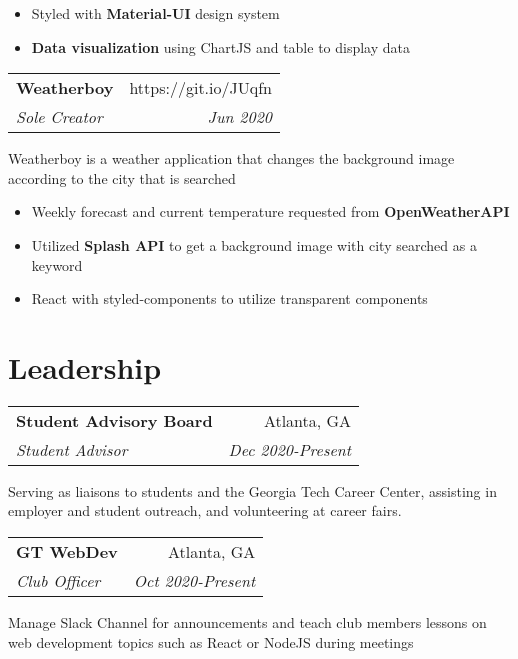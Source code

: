 \documentclass[letterpaper,8pt]{article}
\makeatletter
\newcommand{\resumeSubheading}[4]{
  \vspace{0.25em}
  \begin{tabular*}{1\textwidth}[t]{l@{\extracolsep{\fill}}r}
    \textbf{#1} & #2 \\
    \textit{#3} & \textit{#4} \\
  \end{tabular*}\vspace{-5pt}
}
\makeatother
\begin{document}
\begin{itemize}[label=\raisebox{0.25ex}{\tiny$\bullet$}]
  \item Styled with \textbf{Material-UI} design system
  \item \textbf{Data visualization} using ChartJS and table to display data
\end{itemize}
\vspace{5pt}

\resumeSubheading{Weatherboy}{https://git.io/JUqfn}{Sole Creator}{Jun 2020}

Weatherboy is a weather application that changes the background image according to the city that is searched

\begin{itemize}[label=\raisebox{0.25ex}{\tiny$\bullet$}]
  \item Weekly forecast and current temperature requested from \textbf{OpenWeatherAPI}
  \item Utilized \textbf{Splash API} to get a background image with city searched as a keyword
  \item React with styled-components to utilize transparent components
\end{itemize}
\vspace{5pt}

\section{Leadership}

\resumeSubheading{Student Advisory Board}
{Atlanta, GA}{Student Advisor}{Dec 2020-Present}

Serving as liaisons to students and the Georgia Tech Career Center, assisting in employer and student outreach, and volunteering at career fairs.

\vspace{5pt}
\resumeSubheading{GT WebDev}
{Atlanta, GA}{Club Officer}{Oct 2020-Present}

Manage Slack Channel for announcements and teach club members lessons on web development topics such as React or NodeJS during meetings
\end{document}
